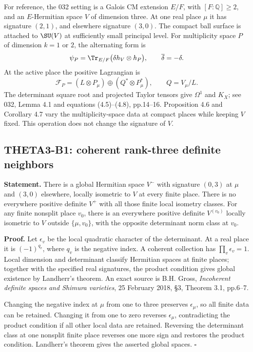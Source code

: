 \documentclass[11pt]{article}
\newcommand{\Q}{\mathbb Q}\newcommand{\C}{\mathbb C}\newcommand{\Z}{\mathbb Z}\newcommand{\R}{\mathbb R}\newcommand{\A}{\mathbb A}\newcommand{\OO}{\mathcal O}
\theoremstyle{definition}\newtheorem{definition}[theorem]{Definition}\newtheorem{remark}[theorem]{Remark}
\begin{document}
For reference, the 032 setting is a Galois CM extension $E/F$, with $[F:\Q]\geq2$, and an $E$-Hermitian space $V$ of dimension three. At one real place $\mu$ it has signature $(2,1)$, and elsewhere signature $(3,0)$. The compact ball surface is attached to $\SU(V)$ at sufficiently small principal level. For multiplicity space $P$ of dimension $k=1$ or $2$, the alternating form is
\[
 \psi_P=\Tr_{E/F}\bigl(\delta h_V\otimes h_P\bigr),
 \qquad \overline\delta=-\delta.
\]
At the active place the positive Lagrangian is
\[
 \mathcal F_P=(L\otimes P_\mu)\oplus(Q^*\otimes P_\mu^*),
 \qquad Q=V_\mu/L.
\]
The determinant square root and projected Taylor tensors give $\Omega^1$ and $K_X$; see 032, Lemma 4.1 and equations (4.5)--(4.8), pp.14--16. Proposition 4.6 and Corollary 4.7 vary the multiplicity-space data at compact places while keeping $V$ fixed. This operation does not change the signature of $V$.

\subsection{THETA3-B1: coherent rank-three definite neighbors}\label{B1}

\textbf{Statement.} There is a global Hermitian space $V^-$ with signature $(0,3)$ at $\mu$ and $(3,0)$ elsewhere, locally isometric to $V$ at every finite place. There is no everywhere positive definite $V^+$ with all those finite local isometry classes. For any finite nonsplit place $v_0$, there is an everywhere positive definite $V^{(v_0)}$ locally isometric to $V$ outside $\{\mu,v_0\}$, with the opposite determinant norm class at $v_0$.

\textbf{Proof.} Let $\epsilon_v$ be the local quadratic character of the determinant. At a real place it is $(-1)^{q_v}$, where $q_v$ is the negative index. A coherent collection has $\prod_v\epsilon_v=1$. Local dimension and determinant classify Hermitian spaces at finite places; together with the specified real signatures, the product condition gives global existence by Landherr's theorem. An exact source is B.H. Gross, \emph{Incoherent definite spaces and Shimura varieties}, 25 February 2018, \S3, Theorem 3.1, pp.6--7.

Changing the negative index at $\mu$ from one to three preserves $\epsilon_\mu$, so all finite data can be retained. Changing it from one to zero reverses $\epsilon_\mu$, contradicting the product condition if all other local data are retained. Reversing the determinant class at one nonsplit finite place reverses one more sign and restores the product condition. Landherr's theorem gives the asserted global spaces. \hfill$\square$
\end{document}
